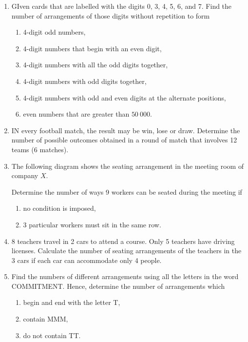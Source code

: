 \documentclass{report}
\begin{document}
\begin{multicols*}{2}
\begin{enumerate}
            \item GIven cards that are labelled with the digits 0, 3, 4, 5, 6, and 7. Find the
                  number of arrangements of those digits without repetition to form
                  \begin{enumerate}
                        \item 4-digit odd numbers,
                        \item 4-digit numbers that begin with an even digit,
                        \item 4-digit numbers with all the odd digits together,
                        \item 4-digit numbers with odd digits together,
                        \item 4-digit numbers with odd and even digits at the alternate positions,
                        \item even numbers that are greater than $50\ 000$.
                  \end{enumerate}

            \item IN every football match, the result may be win, lose or draw. Determine the
                  number of possible outcomes obtained in a round of match that involves 12 teams
                  (6 matches).

            \item The following diagram shows the seating arrangement in the meeting room of
                  company $X$.

                  Determine the number of ways 9 workers can be seated during the meeting if
                  \begin{enumerate}
                        \item no condition is imposed,
                        \item 3 particular workers must sit in the same row.
                  \end{enumerate}

            \item 8 teachers travel in 2 cars to attend a course. Only 5 teachers have driving licenses. Calculate the number of seating arrangements of the teachers in the 3 cars if each car can accommodate only 4 people.

            \item Find the numbers of different arrangements using all the letters in the word
                  COMMITMENT. Hence, determine the number of arrangements which
                  \begin{enumerate}
                        \item begin and end with the letter T,
                        \item contain MMM,
                        \item do not contain TT.
                  \end{enumerate}


\end{enumerate}
\end{multicols*}
\end{document}
